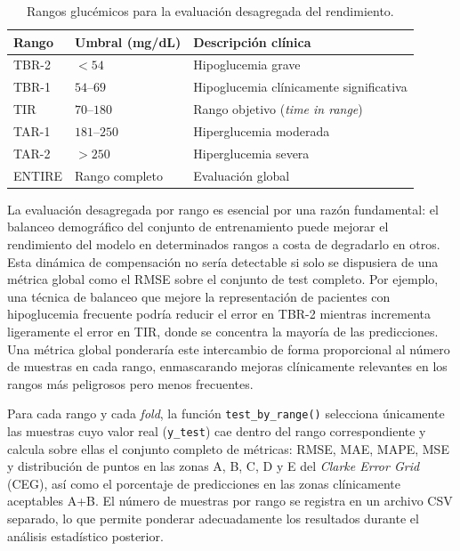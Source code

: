 \begin{table}[htbp]
\centering
\caption{Rangos glucémicos para la evaluación desagregada del rendimiento.}
\label{tab:rangos_glucemicos}
\begin{tabular}{llp{6cm}}
\hline
\textbf{Rango} & \textbf{Umbral (mg/dL)} & \textbf{Descripción clínica} \\
\hline
TBR-2   & $< 54$           & Hipoglucemia grave \\
TBR-1   & $54$--$69$       & Hipoglucemia clínicamente significativa \\
TIR     & $70$--$180$      & Rango objetivo (\textit{time in range}) \\
TAR-1   & $181$--$250$     & Hiperglucemia moderada \\
TAR-2   & $> 250$          & Hiperglucemia severa \\
ENTIRE  & Rango completo   & Evaluación global \\
\hline
\end{tabular}
\end{table}

La evaluación desagregada por rango es esencial por una razón fundamental: el balanceo demográfico del conjunto de entrenamiento puede mejorar el rendimiento del modelo en determinados rangos a costa de degradarlo en otros. Esta dinámica de compensación no sería detectable si solo se dispusiera de una métrica global como el RMSE sobre el conjunto de test completo. Por ejemplo, una técnica de balanceo que mejore la representación de pacientes con hipoglucemia frecuente podría reducir el error en TBR-2 mientras incrementa ligeramente el error en TIR, donde se concentra la mayoría de las predicciones. Una métrica global ponderaría este intercambio de forma proporcional al número de muestras en cada rango, enmascarando mejoras clínicamente relevantes en los rangos más peligrosos pero menos frecuentes.

Para cada rango y cada \textit{fold}, la función \texttt{test\_by\_range()} selecciona únicamente las muestras cuyo valor real (\texttt{y\_test}) cae dentro del rango correspondiente y calcula sobre ellas el conjunto completo de métricas: RMSE, MAE, MAPE, MSE y distribución de puntos en las zonas A, B, C, D y E del \textit{Clarke Error Grid} (CEG), así como el porcentaje de predicciones en las zonas clínicamente aceptables A+B. El número de muestras por rango se registra en un archivo CSV separado, lo que permite ponderar adecuadamente los resultados durante el análisis estadístico posterior.

